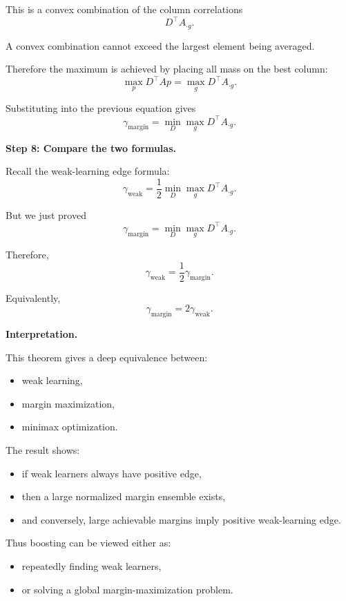 \documentclass[11pt]{article}
\begin{document}
\begin{enumerate}
\begin{solutionbox}
This is a convex combination of the column correlations
\[
D^\top A_{\cdot g}.
\]

A convex combination cannot exceed the largest element being averaged.

Therefore the maximum is achieved by placing all mass on the best column:
\[
\boxed{
\max_pD^\top Ap
=
\max_gD^\top A_{\cdot g}.
}
\]

Substituting into the previous equation gives
\[
\boxed{
\gamma_{\mathrm{margin}}
=
\min_D
\max_g
D^\top A_{\cdot g}.
}
\]

\medskip

\textbf{Step 8: Compare the two formulas.}

Recall the weak-learning edge formula:
\[
\gamma_{\mathrm{weak}}
=
\frac12
\min_D
\max_g
D^\top A_{\cdot g}.
\]

But we just proved
\[
\gamma_{\mathrm{margin}}
=
\min_D
\max_g
D^\top A_{\cdot g}.
\]

Therefore,
\[
\boxed{
\gamma_{\mathrm{weak}}
=
\frac12
\gamma_{\mathrm{margin}}.
}
\]

Equivalently,
\[
\boxed{
\gamma_{\mathrm{margin}}
=
2\gamma_{\mathrm{weak}}.
}
\]

\medskip

\textbf{Interpretation.}

This theorem gives a deep equivalence between:
\begin{itemize}
    \item weak learning,
    \item margin maximization,
    \item minimax optimization.
\end{itemize}

The result shows:
\begin{itemize}
    \item if weak learners always have positive edge,
    \item then a large normalized margin ensemble exists,
    \item and conversely, large achievable margins imply positive weak-learning edge.
\end{itemize}

Thus boosting can be viewed either as:
\begin{itemize}
    \item repeatedly finding weak learners,
    \item or solving a global margin-maximization problem.
\end{itemize}


\end{solutionbox}
\end{enumerate}
\end{document}
